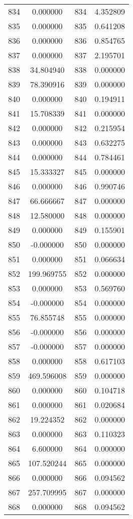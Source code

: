 \documentclass[12pt]{article}
\begin{document}
\begin{longtable}{@{}cccc@{}}
834 & 0.000000 & 834 & 4.352809 \\
835 & 0.000000 & 835 & 0.641208 \\
836 & 0.000000 & 836 & 0.854765 \\
837 & 0.000000 & 837 & 2.195701 \\
838 & 34.804940 & 838 & 0.000000 \\
839 & 78.390916 & 839 & 0.000000 \\
840 & 0.000000 & 840 & 0.194911 \\
841 & 15.708339 & 841 & 0.000000 \\
842 & 0.000000 & 842 & 0.215954 \\
843 & 0.000000 & 843 & 0.632275 \\
844 & 0.000000 & 844 & 0.784461 \\
845 & 15.333327 & 845 & 0.000000 \\
846 & 0.000000 & 846 & 0.990746 \\
847 & 66.666667 & 847 & 0.000000 \\
848 & 12.580000 & 848 & 0.000000 \\
849 & 0.000000 & 849 & 0.155901 \\
850 & -0.000000 & 850 & 0.000000 \\
851 & 0.000000 & 851 & 0.066634 \\
852 & 199.969755 & 852 & 0.000000 \\
853 & 0.000000 & 853 & 0.569760 \\
854 & -0.000000 & 854 & 0.000000 \\
855 & 76.855748 & 855 & 0.000000 \\
856 & -0.000000 & 856 & 0.000000 \\
857 & -0.000000 & 857 & 0.000000 \\
858 & 0.000000 & 858 & 0.617103 \\
859 & 469.596008 & 859 & 0.000000 \\
860 & 0.000000 & 860 & 0.104718 \\
861 & 0.000000 & 861 & 0.020684 \\
862 & 19.224352 & 862 & 0.000000 \\
863 & 0.000000 & 863 & 0.110323 \\
864 & 6.600000 & 864 & 0.000000 \\
865 & 107.520244 & 865 & 0.000000 \\
866 & 0.000000 & 866 & 0.094562 \\
867 & 257.709995 & 867 & 0.000000 \\
868 & 0.000000 & 868 & 0.094562 \\

\end{longtable}
\end{document}
